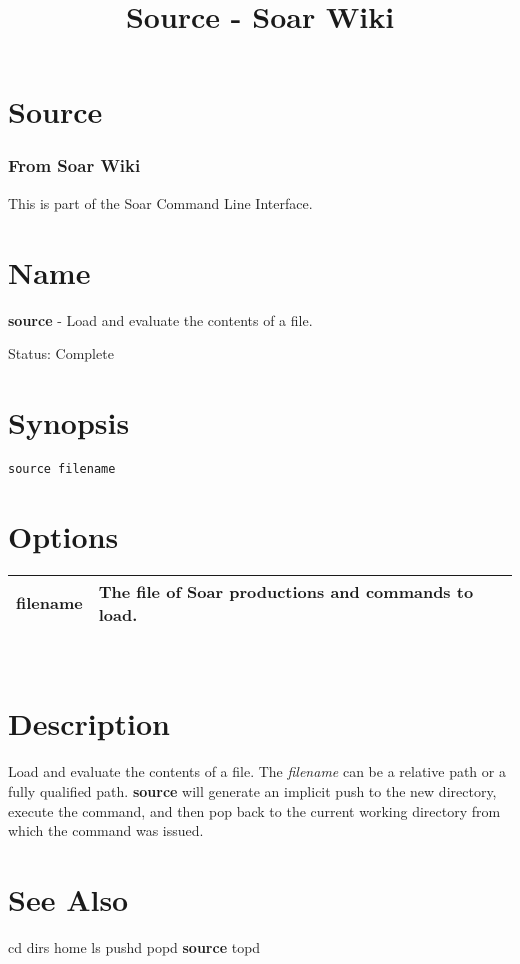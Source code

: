 \documentclass[10pt]{article}
\title{Source - Soar Wiki}
\begin{document}
\section*{Source}
\subsubsection*{From Soar Wiki}


 This is part of the Soar Command Line Interface. 
\section*{ Name }


 \textbf{source}
 - Load and evaluate the contents of a file. 


 Status: Complete
\section*{ Synopsis }
\begin{verbatim}
source filename

\end{verbatim}
\section*{ Options }


\begin{tabular}{|p{1in}|p{5in}|}
\hline 
filename & The file of Soar productions and commands to load.  \\
 \hline 

\end{tabular}



 \\ 

\section*{ Description }


 Load and evaluate the contents of a file. The \emph{filename}
 can be a relative path or a fully qualified path. \textbf{source}
 will generate an implicit push to the new directory, execute the command, and then pop back to the current working directory from which the command was issued. 
\section*{ See Also }
\begin{description}
cd dirs home ls pushd popd \textbf{source}
 topd

\end{description}
\end{document}
